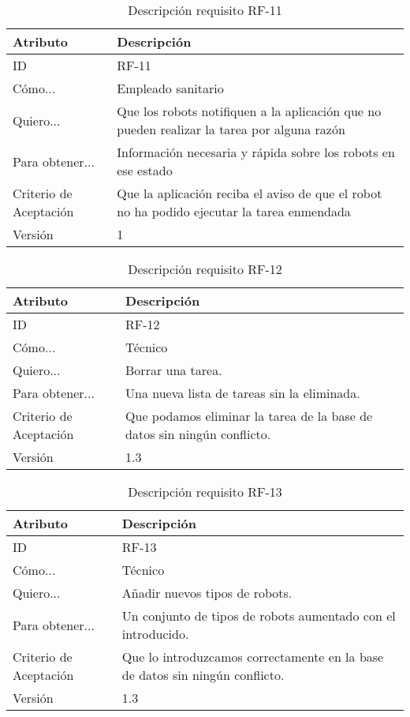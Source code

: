 \begin{table}[H]
    \label{tab:reqF11}
 	\caption{Descripción requisito RF-11}
	\centering

	\begin{tabular}{C{3cm}|C{12cm}}
 		\toprule
 		\textbf{Atributo} & \textbf{Descripción} \\
 		\midrule
 	    ID & RF-11 \\
 	    Cómo... & Empleado sanitario \\
 	    Quiero... & Que los robots notifiquen a la aplicación que no pueden realizar la tarea por alguna razón \\
 	    Para obtener... & Información necesaria y rápida sobre los robots en ese estado  \\
 	    Criterio de Aceptación & Que la aplicación reciba el aviso de que el robot no ha podido ejecutar la tarea enmendada \\
 	    Versión & 1 \\
 		\bottomrule
 		\end{tabular}
\end{table}
\begin{table}[H]
    \label{tab:reqF12}
 	\caption{Descripción requisito RF-12}
	\centering
	
	\begin{tabular}{C{3cm}|C{12cm}}
 		\toprule
 		\textbf{Atributo} & \textbf{Descripción} \\
 		\midrule
 	    ID & RF-12 \\
 	    Cómo... & Técnico \\
 	    Quiero... & Borrar una tarea. \\
 	    Para obtener... & Una nueva lista de tareas sin la eliminada.  \\
 	    Criterio de Aceptación & Que podamos eliminar la tarea de la base de datos sin ningún conflicto.  \\
 	    Versión & 1.3 \\
 		\bottomrule
 		\end{tabular}
\end{table}
\begin{table}[H]
    \label{tab:reqF13}
 	\caption{Descripción requisito RF-13}
	\centering
	
	\begin{tabular}{C{3cm}|C{12cm}}
 		\toprule
 		\textbf{Atributo} & \textbf{Descripción} \\
 		\midrule
 	    ID & RF-13 \\
 	    Cómo... & Técnico \\
 	    Quiero... & Añadir nuevos tipos de robots. \\
 	    Para obtener... & Un conjunto de tipos de robots aumentado con el introducido.  \\
 	    Criterio de Aceptación & Que lo introduzcamos correctamente en la base de datos sin ningún conflicto.  \\
 	    Versión & 1.3 \\
 		\bottomrule
 		\end{tabular}
\end{table}
